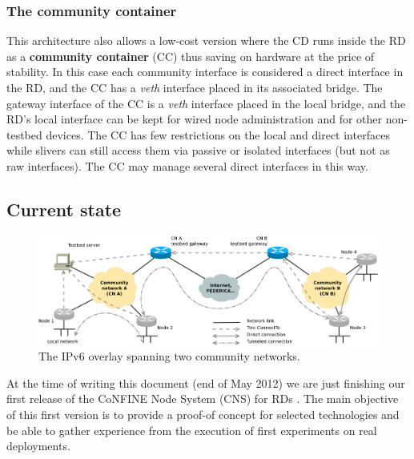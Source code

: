\documentclass[conference]{IEEEtran}
\begin{document}

\subsubsection{The community container}

This architecture also allows a low-cost version where the CD runs inside the
RD as a \textbf{community container} (CC) thus saving on hardware at the price
of stability.  In this case each community interface is considered a direct
interface in the RD, and the CC has a \emph{veth} interface placed in its
associated bridge.  The gateway interface of the CC is a \emph{veth} interface
placed in the local bridge, and the RD's local interface can be kept for wired
node administration and for other non-testbed devices.  The CC has few
restrictions on the local and direct interfaces while slivers can still access
them via passive or isolated interfaces (but not as raw interfaces).  The CC
may manage several direct interfaces in this way.

\subsection{Current state}

\begin{figure}[!t]
\centering
\includegraphics[height=0.20\textheight]{ipv6-overlay}
\caption{The IPv6 overlay spanning two community networks.}
\label{fig:ipv6-overlay}
\end{figure}






At the time of writing this document (end of May 2012) we are just
finishing our first release of the CoNFINE Node System (CNS) for RDs
\cite{a-hack}. The main objective of this first version is to provide
a proof-of concept for selected technologies and be able to gather
experience from the execution of first experiments on real
deployments.
\end{document}
